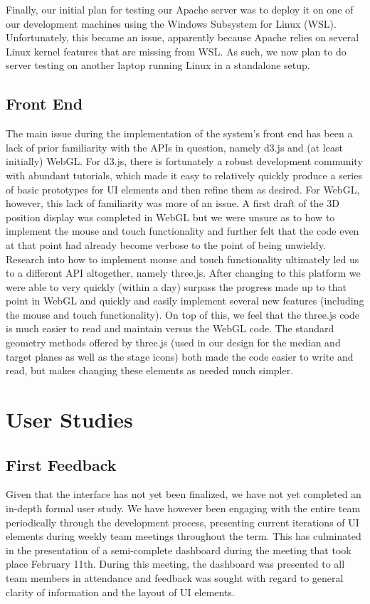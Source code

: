 \documentclass[journal,10pt,onecolumn,compsoc]{IEEEtran}
\begin{document}
		Finally, our initial plan for testing our Apache server	was to deploy it on one of our development machines using the Windows Subsystem for Linux (WSL).
		Unfortunately, this became an issue, apparently because Apache relies on several Linux kernel features that are missing from WSL.
		As such, we now plan to do server testing on another laptop running Linux in a standalone setup.
	
	\subsection{Front End}
		The main issue during the implementation of the system's front end has been a lack of prior familiarity with the APIs in question, namely d3.js and (at least initially) WebGL.
		For d3.js, there is fortunately a robust development community with abundant tutorials, which made it easy to relatively quickly produce a series of basic prototypes for UI elements and then refine them as desired.
		For WebGL, however, this lack of familiarity was more of an issue.
		A first draft of the 3D position display was completed in WebGL but we were unsure as to how to implement the mouse and touch functionality and further felt that the code even at that point had already become verbose to the point of being unwieldy.
		Research into how to implement mouse and touch functionality ultimately led us to a different API altogether, namely three.js.
		After changing to this platform we were able to very quickly (within a day) surpass the progress made up to that point in WebGL and quickly and easily implement several new features (including the mouse and touch functionality).
		On top of this, we feel that the three.js code is much easier to read and maintain versus the WebGL code.
		The standard geometry methods offered by three.js (used in our design for the median and target planes as well as the stage icons) both made the code easier to write and read, but makes changing these elements as needed much simpler.		
\newpage


\section{User Studies}

	\subsection{First Feedback}
		Given that the interface has not yet been finalized, we have not yet completed an in-depth formal user study.
		We have however been engaging with the entire team periodically through the development process, presenting current iterations of UI elements during weekly team meetings throughout the term.
		This has culminated in the presentation of a semi-complete dashboard during the meeting that took place February 11th.
		During this meeting, the dashboard was presented to all team members in attendance and feedback was sought with regard to general clarity of information and the layout of UI elements.
	
\end{document}
